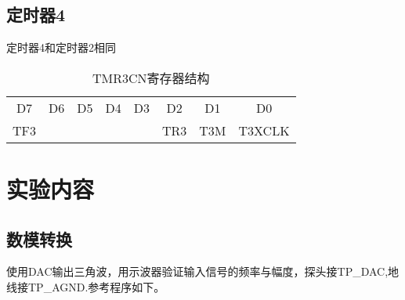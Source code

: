 \begin{CJK}
\begin{table}[!htbp]
\end{table}

\subsection{定时器4}
定时器4和定时器2相同
\begin{table}[!htbp]
  \centering
  \caption{TMR3CN寄存器结构}
  \begin{tabular}{|c|c|c|c|c|c|c|c|}
    \hline
    D7&D6&D5&D4&D3&D2&D1&D0\\
    TF3&&&&&TR3&T3M&T3XCLK\\
    \hline
  \end{tabular}

\end{table}
\section{实验内容}
\subsection{数模转换}
使用DAC输出三角波，用示波器验证输入信号的频率与幅度，探头接TP_DAC,地线接TP_AGND.参考程序如下。
  \vspace{5mm}
	
	\vspace{3mm}



\end{CJK}
